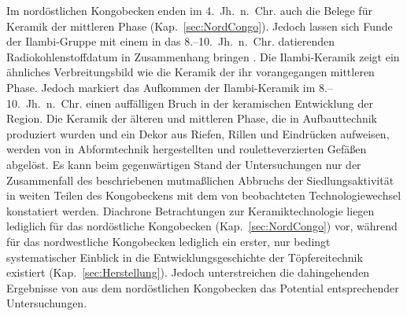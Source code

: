 Im nordöstlichen Kongobecken enden im 4.~Jh.~n.~Chr. auch die Belege für Keramik der mittleren Phase (Kap.~\ref{sec:NordCongo}). Jedoch lassen sich Funde der Ilambi-Gruppe mit einem in das 8.--10.~Jh.~n.~Chr. datierenden Radiokohlenstoffdatum in Zusammenhang bringen \parencite[4 Tab.~1: Poz-75462]{LivingstoneSmith.2017}. Die Ilambi-Keramik zeigt ein ähnliches Verbreitungsbild wie die Keramik der ihr vorangegangen mittleren Phase. Jedoch markiert das Aufkommen der Ilambi-Keramik im 8.--10.~Jh.~n.~Chr. einen auffälligen Bruch in der keramischen Entwicklung der Region. Die Keramik der älteren und mittleren Phase, die in Aufbauttechnik produziert wurden und ein Dekor aus Riefen, Rillen und Eindrücken aufweisen, werden von in Abformtechnik hergestellten und rouletteverzierten Gefäßen abgelöst. Es kann beim gegenwärtigen Stand der Untersuchungen nur der Zusammenfall des beschriebenen mutmaßlichen Abbruchs der Siedlungsaktivität in weiten Teilen des Kongobeckens mit dem von \textcite{LivingstoneSmith.2017} beobachteten Technologiewechsel konstatiert werden. Diachrone Betrachtungen zur Keramiktechnologie liegen lediglich für das nordöstliche Kongobecken (Kap.~\ref{sec:NordCongo}) vor, während für das nordwestliche Kongobecken lediglich ein erster, nur bedingt systematischer Einblick in die Entwicklungsgeschichte der Töpfereitechnik existiert (Kap.~\ref{sec:Herstellung}). Jedoch unterstreichen die dahingehenden Ergebnisse von \textcite{LivingstoneSmith.2017} aus dem nordöstlichen Kongobecken das Potential entsprechender Untersuchungen.

